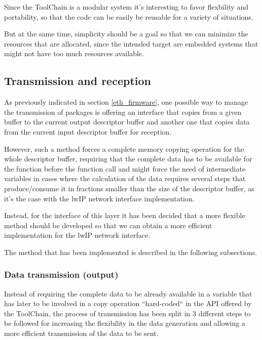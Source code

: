 Since the ToolChain is a modular system it's interesting to favor flexbility and portability, so that the code can be easily be reusable for a variety of situations.

But at the same time, simplicity should be a goal so that we can minimize the resources that are allocated, since the intended target are embedded systems that might not have too much resources available.

\subsection {Transmission and reception}

As previously indicated in section \ref{eth_firmware}, one possible way to manage the transmission of packages is offering an interface that copies from a given buffer to the current output descriptor buffer and another one that copies data from the current input descriptor buffer for reception.

However, such a method forces a complete memory copying operation for the whole descriptor buffer, requiring that the complete data has to be available for the function before the function call and might force the need of intermediate variables in cases where the calculation of the data requires several steps that produce/consume it in fractions smaller than the size of the descriptor buffer, as it's the case with the lwIP network interface implementation.

Instead, for the interface of this layer it has been decided that a more flexible method should be developed so that we can obtain a more efficient implementation for the lwIP network interface.

The method that has been implemented is described in the following subsections.

\subsubsection {Data transmission (output)}
\label{eth_output}

Instead of requiring the complete data to be already available in a variable that has later to be involved in a copy operation  ``hard-coded`` in the API offered by the ToolChain, the process of transmission has been split in 3 different steps to be followed for increasing the flexibility in the data generation and allowing a more efficient transmission of the data to be sent.

